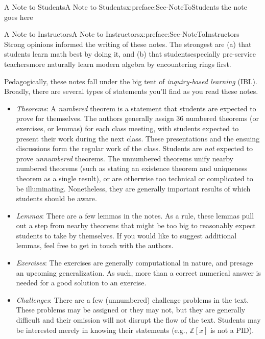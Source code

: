 \documentclass[oneside,10pt,]{book}
\numberwithin{equation}{section}
\def\Z{{\mathbb Z}}
\begin{document}
\typeout{************************************************}
%
\begin{preface}{A Note to Students}{}{A Note to Students}{}{}{x:preface:Sec-NoteToStudents}
the note goes here%
\end{preface}
%
%
\typeout{************************************************}
\typeout{************************************************}
%
\begin{preface}{A Note to Instructors}{}{A Note to Instructors}{}{}{x:preface:Sec-NoteToInstructors}
Strong opinions informed the writing of these notes. The strongest are (a) that students learn math best by doing it, and (b) that students\textendash{}especially pre-service teachers\textendash{}more naturally learn modern algebra by encountering rings first.%
\par
Pedagogically, these notes fall under the big tent of \emph{inquiry-based learning} (IBL). Broadly, there are several types of statements you'll find as you read these notes.%
\begin{itemize}[label=\textbullet]
\item{}\emph{Theorems}: A \emph{numbered} theorem is a statement that students are expected to prove for themselves. The authors generally assign 3\textendash{}6 numbered theorems (or exercises, or lemmas) for each class meeting, with students expected to present their work during the next class. These presentations and the ensuing discussions form the regular work of the class. Students are \emph{not} expected to prove \emph{unnumbered} theorems. The unnumbered theorems unify nearby numbered theorems (such as stating an existence theorem and uniqueness theorem as a single result), or are otherwise too technical or complicated to be illuminating. Nonetheless, they are generally important results of which students should be aware.%
\item{}\emph{Lemmas}: There are a few lemmas in the notes. As a rule, these lemmas pull out a step from nearby theorems that might be too big to reasonably expect students to take by themselves. If you would like to suggest additional lemmas, feel free to get in touch with the authors.%
\item{}\emph{Exercises}: The exercises are generally computational in nature, and presage an upcoming generalization. As such, more than a correct numerical answer is needed for a good solution to an exercise.%
\item{}\emph{Challenges}: There are a few (unnumbered) challenge problems in the text. These problems may be assigned or they may not, but they are generally difficult and their omission will not disrupt the flow of the text. Students may be interested merely in knowing their statements (e.g., \(\Z[x]\) is not a PID).%

\end{itemize}
\end{preface}
\end{document}
